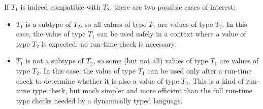If $T_1$ is indeed compatible with $T_2$, there are two possible cases of interest:
\begin{itemize}
  \item $T_1$ is a subtype of $T_2$, so all values of type $T_1$ are values of type $T_2$. In this case, the value of type $T_1$ can be used safely in a context where a value of type $T_2$ is expected; no run-time check is necessary.
  \item $T_1$ is not a subtype of $T_2$, so some (but not all) values of type $T_1$ are values of type $T_2$. In this case, the value of type $T_1$ can be used only after a run-time check to determine whether it is also a value of type $T_2$. This is a kind of run-time type check, but much simpler and more efficient than the full run-time type checks needed by a dynamically typed language.
\end{itemize}
